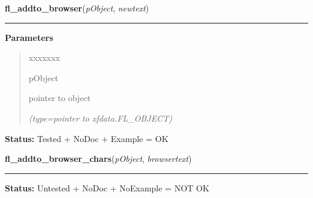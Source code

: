 \hspace{.8\funcindent}\begin{boxedminipage}{\funcwidth}

    \raggedright \textbf{fl\_addto\_browser}(\textit{pObject}, \textit{newtext})

    \vspace{-1.5ex}

    \rule{\textwidth}{0.5\fboxrule}
\setlength{\parskip}{2ex}
\setlength{\parskip}{1ex}
      \textbf{Parameters}
      \vspace{-1ex}

      \begin{quote}
        \begin{Ventry}{xxxxxxx}

          \item[pObject]

          pointer to object

            {\it (type=pointer to xfdata.FL\_OBJECT)}

        \end{Ventry}

      \end{quote}

\textbf{Status:} Tested + NoDoc + Example = OK



    \end{boxedminipage}

    \label{xformslib:library:fl_addto_browser_chars}

    \vspace{0.5ex}

\hspace{.8\funcindent}\begin{boxedminipage}{\funcwidth}

    \raggedright \textbf{fl\_addto\_browser\_chars}(\textit{pObject}, \textit{browsertext})

    \vspace{-1.5ex}

    \rule{\textwidth}{0.5\fboxrule}
\setlength{\parskip}{2ex}
\setlength{\parskip}{1ex}
\textbf{Status:} Untested + NoDoc + NoExample = NOT OK



    \end{boxedminipage}

    \label{xformslib:library:fl_addto_browser_chars}

